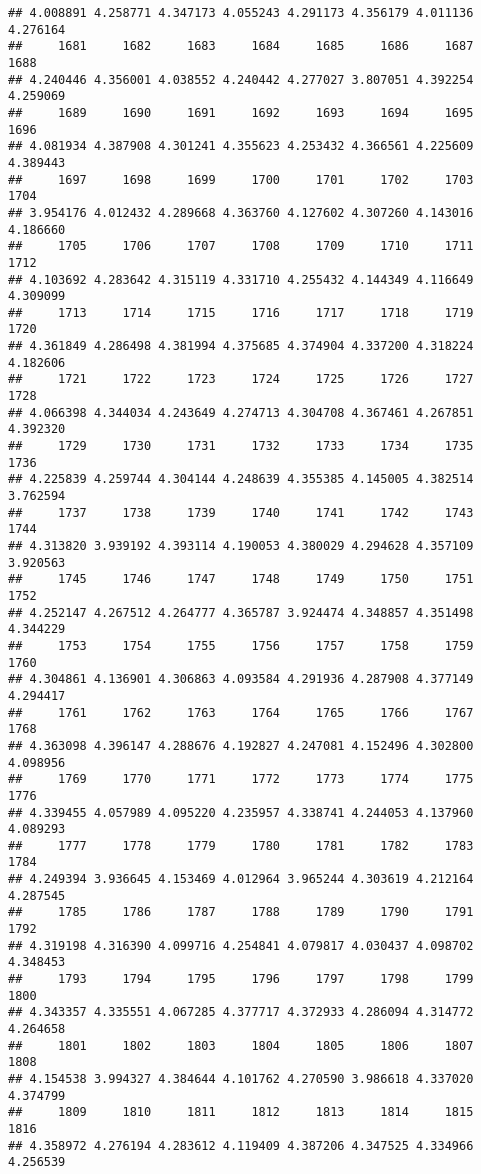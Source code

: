 \documentclass[
]{article}
\begin{document}
\begin{verbatim}
## 4.008891 4.258771 4.347173 4.055243 4.291173 4.356179 4.011136 4.276164 
##     1681     1682     1683     1684     1685     1686     1687     1688 
## 4.240446 4.356001 4.038552 4.240442 4.277027 3.807051 4.392254 4.259069 
##     1689     1690     1691     1692     1693     1694     1695     1696 
## 4.081934 4.387908 4.301241 4.355623 4.253432 4.366561 4.225609 4.389443 
##     1697     1698     1699     1700     1701     1702     1703     1704 
## 3.954176 4.012432 4.289668 4.363760 4.127602 4.307260 4.143016 4.186660 
##     1705     1706     1707     1708     1709     1710     1711     1712 
## 4.103692 4.283642 4.315119 4.331710 4.255432 4.144349 4.116649 4.309099 
##     1713     1714     1715     1716     1717     1718     1719     1720 
## 4.361849 4.286498 4.381994 4.375685 4.374904 4.337200 4.318224 4.182606 
##     1721     1722     1723     1724     1725     1726     1727     1728 
## 4.066398 4.344034 4.243649 4.274713 4.304708 4.367461 4.267851 4.392320 
##     1729     1730     1731     1732     1733     1734     1735     1736 
## 4.225839 4.259744 4.304144 4.248639 4.355385 4.145005 4.382514 3.762594 
##     1737     1738     1739     1740     1741     1742     1743     1744 
## 4.313820 3.939192 4.393114 4.190053 4.380029 4.294628 4.357109 3.920563 
##     1745     1746     1747     1748     1749     1750     1751     1752 
## 4.252147 4.267512 4.264777 4.365787 3.924474 4.348857 4.351498 4.344229 
##     1753     1754     1755     1756     1757     1758     1759     1760 
## 4.304861 4.136901 4.306863 4.093584 4.291936 4.287908 4.377149 4.294417 
##     1761     1762     1763     1764     1765     1766     1767     1768 
## 4.363098 4.396147 4.288676 4.192827 4.247081 4.152496 4.302800 4.098956 
##     1769     1770     1771     1772     1773     1774     1775     1776 
## 4.339455 4.057989 4.095220 4.235957 4.338741 4.244053 4.137960 4.089293 
##     1777     1778     1779     1780     1781     1782     1783     1784 
## 4.249394 3.936645 4.153469 4.012964 3.965244 4.303619 4.212164 4.287545 
##     1785     1786     1787     1788     1789     1790     1791     1792 
## 4.319198 4.316390 4.099716 4.254841 4.079817 4.030437 4.098702 4.348453 
##     1793     1794     1795     1796     1797     1798     1799     1800 
## 4.343357 4.335551 4.067285 4.377717 4.372933 4.286094 4.314772 4.264658 
##     1801     1802     1803     1804     1805     1806     1807     1808 
## 4.154538 3.994327 4.384644 4.101762 4.270590 3.986618 4.337020 4.374799 
##     1809     1810     1811     1812     1813     1814     1815     1816 
## 4.358972 4.276194 4.283612 4.119409 4.387206 4.347525 4.334966 4.256539 

\end{verbatim}
\end{document}

